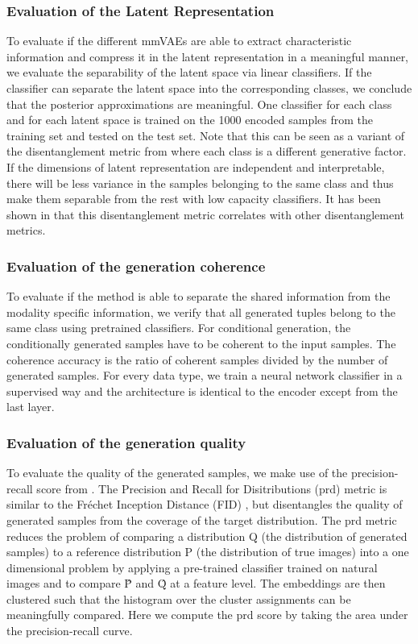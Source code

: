 \subsubsection{Evaluation of the Latent Representation}
To evaluate if the different mmVAEs are able to extract characteristic information and compress it in the latent representation in a meaningful manner, we evaluate the separability of the latent space via linear classifiers.
If the classifier can separate the latent space into the corresponding classes, we conclude that the posterior approximations are meaningful.
One classifier for each class and for each latent space is trained on the 1000 encoded samples from the training set and tested on the test set.
Note that this can be seen as a variant of the disentanglement metric from \cite{beta_vae} where each class is a different generative factor.
If the dimensions of latent representation are independent and interpretable, there will be less variance in the samples belonging to the same class and thus make them separable from the rest with low capacity classifiers.
It has been shown in \cite{locatello_challenging_2019} that this disentanglement metric correlates with other disentanglement metrics.

\subsubsection{Evaluation of the generation coherence}
\label{subsubsec:gen_coh}
To evaluate if the method is able to separate the shared information from the modality specific information, we verify that all generated tuples belong to the same class using pretrained classifiers.
For conditional generation, the conditionally generated samples have to be coherent to the input samples.
The coherence accuracy is the ratio of coherent samples divided by the number of generated samples.
For every data type, we train a neural network classifier in a supervised way and the architecture is identical to the encoder except from the last layer.

\subsubsection{Evaluation of the generation quality}
\label{subsubsec:gen_qual}
To evaluate the quality of the generated samples, we make use of the precision-recall score from \cite{precision_recall_distributions}.
The Precision and Recall for Disitributions (prd) metric is similar to the Fréchet Inception Distance (FID) \citep{heusel_gans_2017}, but disentangles the quality of generated samples from the coverage of the target distribution.
The prd metric reduces the problem of comparing a distribution Q (the distribution of generated samples) to a reference distribution P (the distribution of true images) into a one dimensional problem by applying a pre-trained classifier trained on natural images and to compare \^{P} and \^{Q} at a feature level.
The embeddings are then clustered such that the histogram over the cluster assignments can be meaningfully compared.
Here we compute the prd score by taking the area under the precision-recall curve.

